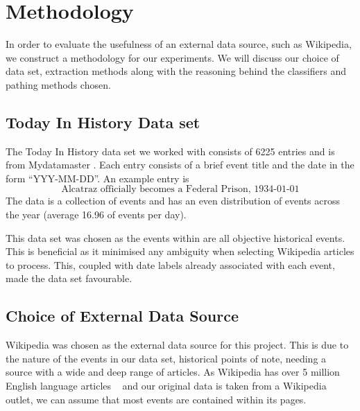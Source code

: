 \documentclass[bsc,frontabs,twoside,singlespacing,parskip,deptreport]{infthesis}     %
\begin{document}
\chapter{Methodology}\label{chapter:methodology}
In order to evaluate the usefulness of an external data source, such as Wikipedia, we construct a methodology
for our experiments. We will discuss our choice of data set, extraction methods along with the reasoning behind the
classifiers and pathing methods chosen.


\section{Today In History Data set}
The Today In History data set we worked with consists of 6225 entries and is from Mydatamaster \cite{mydatamaster}.
Each entry consists of a  brief event title and the date in the form ``YYY-MM-DD''.
An example entry is
\begin{equation}
  \text{Alcatraz officially becomes a Federal Prison, 1934-01-01}\nonumber
\end{equation}
The data is a collection of events and has
an even distribution of events across the year (average 16.96 of events per day).

This data set was chosen as the events within are all objective historical events. This is beneficial as it minimised
any ambiguity when selecting Wikipedia articles to process. This, coupled with date labels already associated with
each event, made the data set favourable.


\section{Choice of External Data Source}
Wikipedia was chosen as the external data source for this project.
This is due to the nature of the events in our data set, historical points of note,
needing a source with a wide and deep range of articles.
As Wikipedia has over 5 million English language articles ~\cite{wikipediasize} and our original data
is taken from a Wikipedia outlet, we can assume
that most events are contained within its pages.
\end{document}
